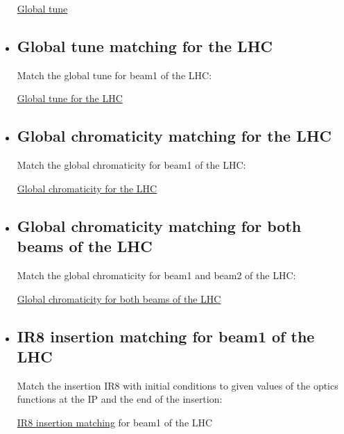 \begin{itemize}
\href{http://cern.ch/madx/madX/examples/match/global-tune/job.global-tune.madx}{Global tune}
	
	\item \subsection{Global tune matching for the LHC}
	Match the global tune for beam1 of the LHC: 

\href{http://cern.ch/madx/madX/examples/match/lhc.tune/job.lhc.tune.madx}{Global tune for the LHC}
	
	\item \subsection{Global chromaticity matching for the LHC}
	Match the global chromaticity for beam1 of the LHC: 

\href{http://cern.ch/madx/madX/examples/match/lhc.chromaticity/job.lhc.chromaticity.madx}{Global chromaticity for the LHC}

	\item \subsection{Global chromaticity matching for both beams of the LHC}
	Match the global chromaticity for beam1 and beam2 of the LHC: 

\href{http://cern.ch/madx/madX/examples/match/lhc.2chromaticity/job.lhc.2chromaticity.madx}{Global chromaticity for both beams of the LHC}
	
	\item \subsection{IR8 insertion matching for beam1 of the LHC}
	Match the insertion IR8 with initial conditions to given values of the optics  functions at the IP and the end of the insertion: 

\href{http://cern.ch/madx/madX/examples/match/lhc.insertion/job.lhc.insertion.madx}{IR8 insertion matching} for beam1 of the LHC
	

\end{itemize}
